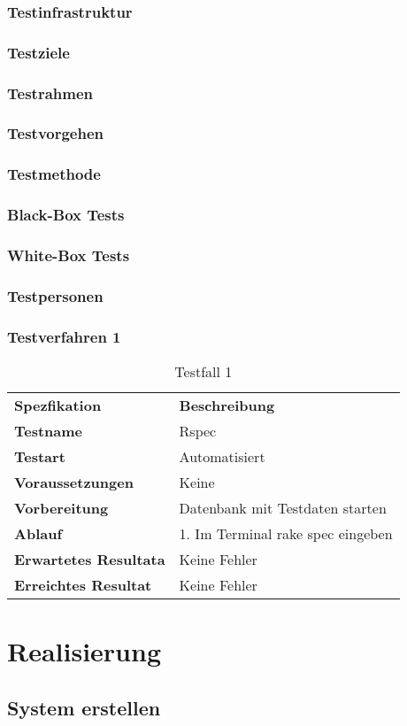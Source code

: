 \subsection{Testinfrastruktur}
\subsection{Testziele}
\subsection{Testrahmen}
\subsection{Testvorgehen}
\subsection{Testmethode}
\subsection{Black-Box Tests}
\subsection{White-Box Tests}
\subsection{Testpersonen}
\subsection{Testverfahren 1}
\begin{table}[H]
    \begin{tabular}{|l|l|}
        \hline
        \rowcolor{puzzleblue} \multicolumn{2}{|l|}{Testfall Nr. 1}  \\[10pt]
        \hline
        \textbf{Spezfikation} & \textbf{Beschreibung} \\
        \hline
        \rowcolor{puzzleblue!25}\textbf{Testname} & Rspec \\
        \hline
        \textbf{Testart} & Automatisiert \\
        \hline
        \rowcolor{puzzleblue!25}\textbf{Voraussetzungen} & Keine \\
        \hline
        \textbf{Vorbereitung} & Datenbank mit Testdaten starten \\
        \hline
        \rowcolor{puzzleblue!25}\textbf{Ablauf} & 1. Im Terminal rake spec eingeben \\
        \hline
        \textbf{Erwartetes Resultata} & Keine Fehler \\
        \hline
        \rowcolor{puzzleblue!25}\textbf{Erreichtes Resultat} & Keine Fehler \\
        \hline
    \end{tabular}
    \caption{Testfall 1}
\end{table}
\chapter{Realisierung}
\section{System erstellen}
